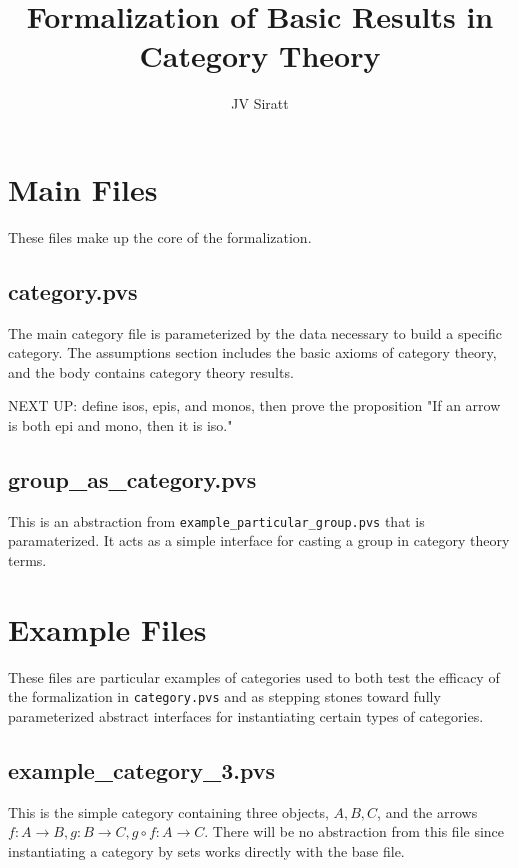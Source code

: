 \documentclass[11pt]{article}
\title{Formalization of Basic Results in Category Theory}
\author{JV Siratt}
\begin{document}
\maketitle

\section{Main Files}

These files make up the core of the formalization.

\subsection{category.pvs}

The main category file is parameterized by the data necessary to build a specific category.  The assumptions section includes the basic axioms of category theory, and the body contains category theory results.

NEXT UP: define isos, epis, and monos, then prove the proposition "If an arrow is both epi and mono, then it is iso."

\subsection{group\_as\_category.pvs}

This is an abstraction from \texttt{example\_particular\_group.pvs} that is paramaterized.  It acts as a simple interface for casting a group in category theory terms.

\section{Example Files}

These files are particular examples of categories used to both test the efficacy of the formalization in \texttt{category.pvs} and as stepping stones toward fully parameterized abstract interfaces for instantiating certain types of categories.

\subsection{example\_category\_3.pvs}

This is the simple category containing three objects, $A, B, C$, and the arrows $f:A\to B, g:B\to C, g\circ f:A\to C$. There will be no abstraction from this file since instantiating a category by sets works directly with the base file.
\end{document}
